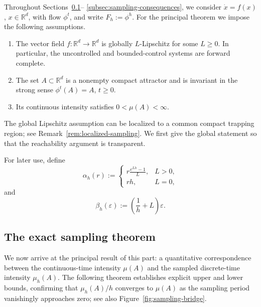 \documentclass[pdflatex,sn-mathphys-num]{sn-jnl}
\numberwithin{equation}{section}
\theoremstyle{thmstyleone}%
\theoremstyle{definition}
\theoremstyle{remark}
\begin{document}
Throughout Sections~\ref{subsec:main-sampling-theorem}--%
\ref{subsec:sampling-consequences}, we consider
$\dot x=f(x)$, $x\in\mathbb R^d$,
with flow $\phi^t$, and write
$F_h:=\phi^h$.
For the principal theorem we impose the following assumptions.
\begin{enumerate}
\renewcommand{\theenumi}{(H\arabic{enumi})}
\renewcommand{\labelenumi}{\textnormal{\theenumi}}
\item
\label{hyp:forward-complete}
The vector field $f:\mathbb R^d\to\mathbb R^d$ is globally
$L$-Lipschitz for some $L\geq0$. In particular, the uncontrolled and
bounded-control systems are forward complete.
\item
\label{hyp:compact-attractor}
The set $A\subset\mathbb R^d$ is a nonempty compact attractor and is
invariant in the strong sense
    $\phi^t(A)=A$, $t\geq0$.
\item
\label{hyp:positive-finite-intensity}
Its continuous intensity satisfies
    $0<\mu(A)<\infty$.
\end{enumerate}
The global Lipschitz assumption can be localized to a common compact
trapping region; see Remark~\ref{rem:localized-sampling}. We first give
the global statement so that the reachability argument is transparent.

For later use, define
\begin{equation}
\label{eq:alpha-h-definition}
    \alpha_h(r)
    :=
    \begin{cases}
    \displaystyle
    r\frac{e^{Lh}-1}{L},
        & L>0,\\[2ex]
    rh, & L=0,
    \end{cases}
\end{equation}
and
\begin{equation}
\label{eq:beta-h-definition}
    \beta_h(\varepsilon)
    :=
    \left(\frac1h+L\right)\varepsilon.
\end{equation}

\subsection{The exact sampling theorem}
\label{subsec:main-sampling-theorem}

We now arrive at the principal result of this part: a quantitative correspondence between the continuous-time intensity $\mu(A)$ and the sampled discrete-time intensity $\mu_h(A)$. The following theorem establishes explicit upper and lower bounds, confirming that $\mu_h(A)/h$ converges to $\mu(A)$ as the sampling period vanishingly approaches zero; see also Figure~\ref{fig:sampling-bridge}.
\end{document}
